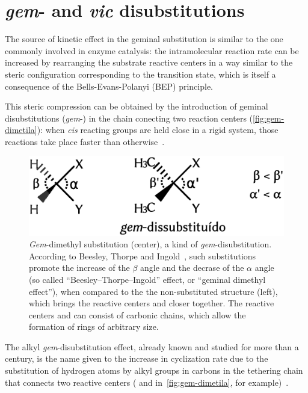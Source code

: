 \chapter{\emph{gem}- and \emph{vic} disubstitutions}%
\label{ch:gem-vic-disubstitions}

The source of kinetic effect in the geminal substitution is similar to the one
commonly involved in enzyme catalysis: the intramolecular reaction rate can be
increased by rearranging the substrate reactive centers in a way similar to the
steric configuration corresponding to the transition state, which is itself a
consequence of the Bells-Evans-Polanyi (BEP) principle.

This steric compression can be obtained by the introduction of geminal
disubstitutions (\emph{gem}-) in the chain conecting two reaction centers
(\autoref{fig:gem-dimetila}):
when \emph{cis} reacting groups are held close in a rigid system,
those reactions take place faster than
otherwise~\cite{Beesley_1915,Allinger_1960,Bruice_1960a,Bruice_1960b,Capon_1964,Bruice_1965,Kirby_1972,Galli_1979,Kirby_1980,Lightstone_1994,Kaneti_2004,Jung_2005,Karaman_2011}.
%
\begin{figure}[hbtp]
    \centering
    \includegraphics[width=.55\textwidth]{figures/gem-dimetil-pt}
    \caption[Beesley--Thorpe--Ingold effect, also known as geminal dimethyl
    effect.]{
        \emph{Gem}-dimethyl substitution (center), a kind of
        \emph{gem}-disubstitution.
        According to Beesley, Thorpe and Ingold~\cite{Beesley_1915,Jung_2005},
        such substitutions promote the increase of the $\beta$ angle and the
        decrase of the $\alpha$ angle (so called ``Beesley--Thorpe--Ingold''
        effect, or ``geminal dimethyl effect''),
        when compared to the the non-substituted structure (left),
        which brings the reactive centers
         and 
        closer together.
        The reactive centers  and  can consist of
        carbonic chains,
        which allow the formation of rings of arbitrary size.}\label{fig:gem-dimetila}
\end{figure}
%
The alkyl \emph{gem}-disubstitution effect,
already known and studied for more than a century,
is the name given to the increase in cyclization rate due
to the substitution of hydrogen atoms by alkyl groups in carbons in the
tethering chain that connects two reactive centers ( and 
in~\autoref{fig:gem-dimetila}, for example)~\cite{Capon_1964,Kirby_1980,Kaneti_2004,Jung_2005}.


